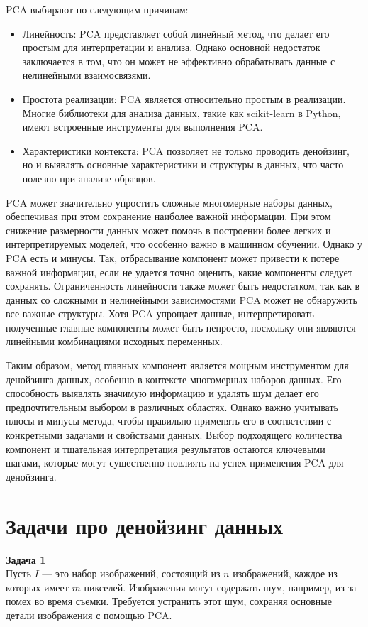 PCA выбирают по следующим причинам:
\begin{itemize}
    \item Линейность: PCA представляет собой линейный метод, что делает его простым для интерпретации и анализа. Однако основной недостаток заключается в том, что он может не эффективно обрабатывать данные с нелинейными взаимосвязями.

    \item Простота реализации: PCA является относительно простым в реализации. Многие библиотеки для анализа данных, такие как scikit-learn в Python, имеют встроенные инструменты для выполнения PCA.

    \item Характеристики контекста: PCA позволяет не только проводить денойзинг, но и выявлять основные характеристики и структуры в данных, что часто полезно при анализе образцов.
\end{itemize}

PCA может значительно упростить сложные многомерные наборы данных, обеспечивая при этом сохранение наиболее важной информации. При этом снижение размерности данных может помочь в построении более легких и интерпретируемых моделей, что особенно важно в машинном обучении.
Однако у PCA есть и минусы. Так, отбрасывание компонент может привести к потере важной информации, если не удается точно оценить, какие компоненты следует сохранять. Ограниченность линейности также может быть недостатком, так как в данных со сложными и нелинейными зависимостями PCA может не обнаружить все важные структуры. Хотя PCA упрощает данные, интерпретировать полученные главные компоненты может быть непросто, поскольку они являются линейными комбинациями исходных переменных.

Таким образом, метод главных компонент является мощным инструментом для денойзинга данных, особенно в контексте многомерных наборов данных. Его способность выявлять значимую информацию и удалять шум делает его предпочтительным выбором в различных областях. Однако важно учитывать плюсы и минусы метода, чтобы правильно применять его в соответствии с конкретными задачами и свойствами данных. Выбор подходящего количества компонент и тщательная интерпретация результатов остаются ключевыми шагами, которые могут существенно повлиять на успех применения PCA для денойзинга.

\section{Задачи про денойзинг данных}
\textbf{Задача 1}\\
Пусть \( I \) — это набор изображений, состоящий из \( n \) изображений, каждое из которых имеет \( m \) пикселей. Изображения могут содержать шум, например, из-за помех во время съемки. Требуется устранить этот шум, сохраняя основные детали изображения с помощью PCA.

